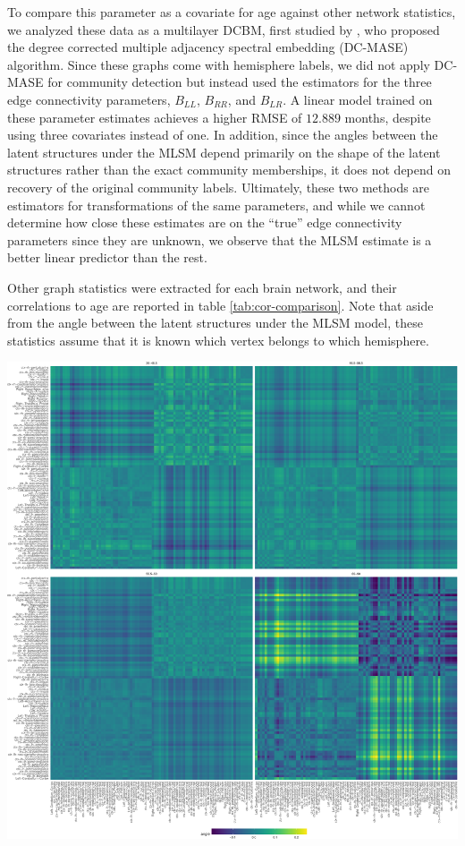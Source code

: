 \documentclass[12pt]{article}
\begin{document}
To compare this parameter as a covariate for age against other network
statistics, we analyzed these data as a multilayer DCBM, first studied
by \citep{agterberg2022joint}, who proposed the degree corrected
multiple adjacency spectral embedding (DC-MASE) algorithm. Since these
graphs come with hemisphere labels, we did not apply DC-MASE for
community detection but instead used the estimators for the three edge
connectivity parameters, \(B_{LL}\), \(B_{RR}\), and \(B_{LR}\). A
linear model trained on these parameter estimates achieves a higher RMSE
of \(12.889\) months, despite using three covariates instead of one. In
addition, since the angles between the latent structures under the MLSM
depend primarily on the shape of the latent structures rather than the
exact community memberships, it does not depend on recovery of the
original community labels. Ultimately, these two methods are estimators
for transformations of the same parameters, and while we cannot
determine how close these estimates are on the ``true'' edge
connectivity parameters since they are unknown, we observe that the MLSM
estimate is a better linear predictor than the rest.

Other graph statistics were extracted for each brain network, and their
correlations to age are reported in table \ref{tab:cor-comparison}. Note
that aside from the angle between the latent structures under the MLSM
model, these statistics assume that it is known which vertex belongs to
which hemisphere.

\begin{center}\includegraphics[width=1\linewidth]{draft_files/figure-latex/cosine-heatmap-1} \end{center}
\end{document}
